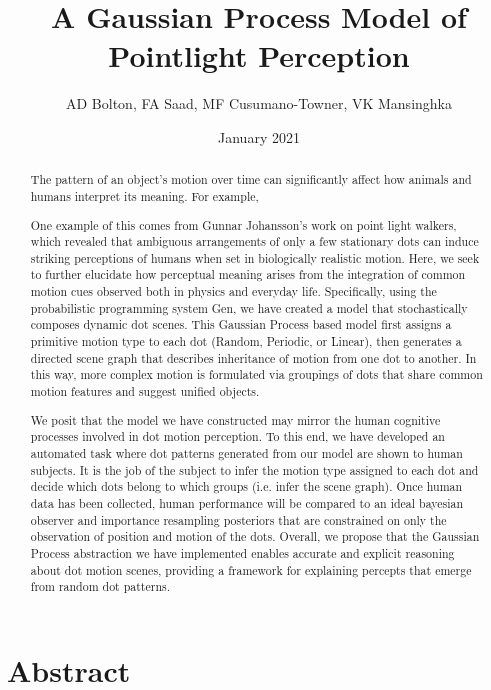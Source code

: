 \documentclass{scrartcl}
\title{A Gaussian Process Model of Pointlight Perception}
\author{AD Bolton, FA Saad, MF Cusumano-Towner, VK Mansinghka}
\date{January 2021}
\begin{document}
\maketitle


\section{Abstract}
\begin{abstract}
  The pattern of an object's motion over time can significantly affect how animals and humans interpret its meaning. For example,

  


  One example of this comes from Gunnar Johansson's work on point light walkers, which revealed that ambiguous arrangements of only a few stationary dots can induce striking perceptions of humans when set in biologically realistic motion. Here, we seek to further elucidate how perceptual meaning arises from the integration of common motion cues observed both in physics and everyday life. Specifically, using the probabilistic programming system Gen, we have created a model that stochastically composes dynamic dot scenes. This Gaussian Process based model first assigns a primitive motion type to each dot (Random, Periodic, or Linear), then generates a directed scene graph that describes inheritance of motion from one dot to another. In this way, more complex motion is formulated via groupings of dots that share common motion features and suggest unified objects. 
  
  We posit that the model we have constructed may mirror the human cognitive processes involved in dot motion perception. To this end, we have developed an automated task where dot patterns generated from our model are shown to human subjects. It is the job of the subject to infer the motion type assigned to each dot and decide which dots belong to which groups (i.e. infer the scene graph). Once human data has been collected, human performance will be compared to an ideal bayesian observer and importance resampling posteriors that are constrained on only the observation of position and motion of the dots. Overall, we propose that the Gaussian Process abstraction we have implemented enables accurate and explicit reasoning about dot motion scenes, providing a framework for explaining percepts that emerge from random dot patterns.

  
\end{abstract}

\vspace{20mm}
\end{document}
